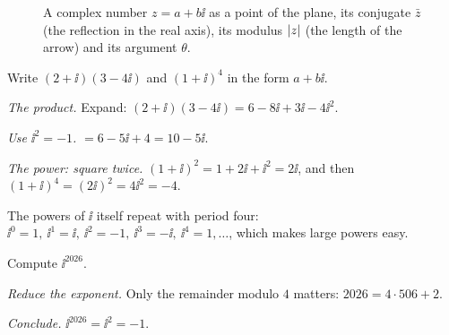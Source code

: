 \begin{figure}[htb]
  \centering
  \caption{A complex number $z=a+b\ii$ as a point of the plane, its conjugate $\bar z$ (the reflection in the real axis), its modulus $\left|z\right|$ (the length of the arrow) and its argument $\theta$.}
  \label{fig:plane}
\end{figure}

\begin{example}[Arithmetic]\label{ex:arith}
  Write $(2+\ii)(3-4\ii)$ and $(1+\ii)^4$ in the form $a+b\ii$.
\end{example}
\begin{solution}
  \begin{steps}
    \item \emph{The product.} Expand: $(2+\ii)(3-4\ii)=6-8\ii+3\ii-4\ii^2$.
    \item \emph{Use $\ii^2=-1$.} $=6-5\ii+4=10-5\ii$.
    \item \emph{The power: square twice.} $(1+\ii)^2=1+2\ii+\ii^2=2\ii$, and then $(1+\ii)^4=(2\ii)^2=4\ii^2=-4$.
  \end{steps}
\end{solution}

The powers of $\ii$ itself repeat with period four: $\ii^0=1,\ \ii^1=\ii,\ \ii^2=-1,\ \ii^3=-\ii,\ \ii^4=1,\dots$, which makes large powers easy.

\begin{example}\label{ex:powers-of-i}
  Compute $\ii^{2026}$.
\end{example}
\begin{solution}
  \begin{steps}
    \item \emph{Reduce the exponent.} Only the remainder modulo $4$ matters: $2026=4\cdot506+2$.
    \item \emph{Conclude.} $\ii^{2026}=\ii^2=-1$.
  \end{steps}
\end{solution}

